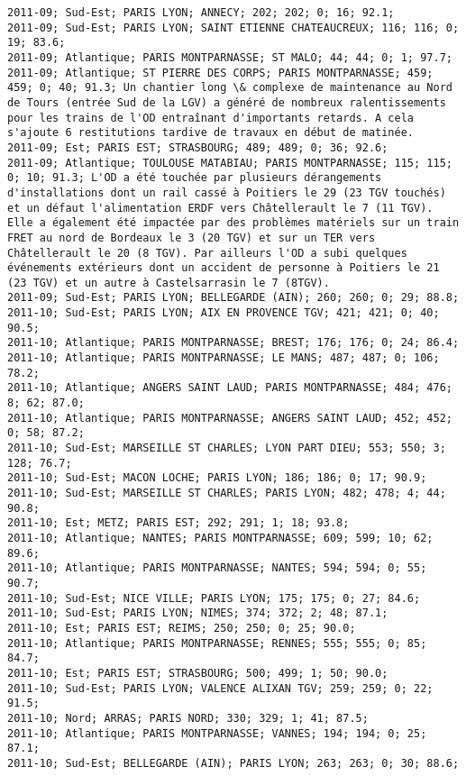 \documentclass{article}
\begin{document}
\begin{Verbatim}[commandchars=\\\{\}]
2011-09; Sud-Est; PARIS LYON; ANNECY; 202; 202; 0; 16; 92.1; 
2011-09; Sud-Est; PARIS LYON; SAINT ETIENNE CHATEAUCREUX; 116; 116; 0; 19; 83.6; 
2011-09; Atlantique; PARIS MONTPARNASSE; ST MALO; 44; 44; 0; 1; 97.7; 
2011-09; Atlantique; ST PIERRE DES CORPS; PARIS MONTPARNASSE; 459; 459; 0; 40; 91.3; Un chantier long \& complexe de maintenance au Nord de Tours (entrée Sud de la LGV) a généré de nombreux ralentissements pour les trains de l'OD entraînant d'importants retards. A cela s'ajoute 6 restitutions tardive de travaux en début de matinée.
2011-09; Est; PARIS EST; STRASBOURG; 489; 489; 0; 36; 92.6; 
2011-09; Atlantique; TOULOUSE MATABIAU; PARIS MONTPARNASSE; 115; 115; 0; 10; 91.3; L'OD a été touchée par plusieurs dérangements d'installations dont un rail cassé à Poitiers le 29 (23 TGV touchés) et un défaut l'alimentation ERDF vers Châtellerault le 7 (11 TGV). Elle a également été impactée par des problèmes matériels sur un train FRET au nord de Bordeaux le 3 (20 TGV) et sur un TER vers Châtellerault le 20 (8 TGV). Par ailleurs l'OD a subi quelques événements extérieurs dont un accident de personne à Poitiers le 21 (23 TGV) et un autre à Castelsarrasin le 7 (8TGV).
2011-09; Sud-Est; PARIS LYON; BELLEGARDE (AIN); 260; 260; 0; 29; 88.8; 
2011-10; Sud-Est; PARIS LYON; AIX EN PROVENCE TGV; 421; 421; 0; 40; 90.5; 
2011-10; Atlantique; PARIS MONTPARNASSE; BREST; 176; 176; 0; 24; 86.4; 
2011-10; Atlantique; PARIS MONTPARNASSE; LE MANS; 487; 487; 0; 106; 78.2; 
2011-10; Atlantique; ANGERS SAINT LAUD; PARIS MONTPARNASSE; 484; 476; 8; 62; 87.0; 
2011-10; Atlantique; PARIS MONTPARNASSE; ANGERS SAINT LAUD; 452; 452; 0; 58; 87.2; 
2011-10; Sud-Est; MARSEILLE ST CHARLES; LYON PART DIEU; 553; 550; 3; 128; 76.7; 
2011-10; Sud-Est; MACON LOCHE; PARIS LYON; 186; 186; 0; 17; 90.9; 
2011-10; Sud-Est; MARSEILLE ST CHARLES; PARIS LYON; 482; 478; 4; 44; 90.8; 
2011-10; Est; METZ; PARIS EST; 292; 291; 1; 18; 93.8; 
2011-10; Atlantique; NANTES; PARIS MONTPARNASSE; 609; 599; 10; 62; 89.6; 
2011-10; Atlantique; PARIS MONTPARNASSE; NANTES; 594; 594; 0; 55; 90.7; 
2011-10; Sud-Est; NICE VILLE; PARIS LYON; 175; 175; 0; 27; 84.6; 
2011-10; Sud-Est; PARIS LYON; NIMES; 374; 372; 2; 48; 87.1; 
2011-10; Est; PARIS EST; REIMS; 250; 250; 0; 25; 90.0; 
2011-10; Atlantique; PARIS MONTPARNASSE; RENNES; 555; 555; 0; 85; 84.7; 
2011-10; Est; PARIS EST; STRASBOURG; 500; 499; 1; 50; 90.0; 
2011-10; Sud-Est; PARIS LYON; VALENCE ALIXAN TGV; 259; 259; 0; 22; 91.5; 
2011-10; Nord; ARRAS; PARIS NORD; 330; 329; 1; 41; 87.5; 
2011-10; Atlantique; PARIS MONTPARNASSE; VANNES; 194; 194; 0; 25; 87.1; 
2011-10; Sud-Est; BELLEGARDE (AIN); PARIS LYON; 263; 263; 0; 30; 88.6; 

\end{Verbatim}
\end{document}
